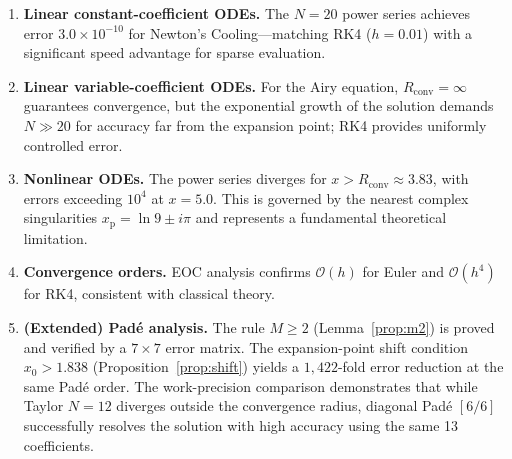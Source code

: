 \documentclass[12pt,a4paper]{article}
\theoremstyle{definition}
\theoremstyle{remark}
\newcommand{\Rconv}{R_{\mathrm{conv}}}
\newcommand{\xp}{x_{\mathrm{p}}}
\newcommand{\OO}{\mathcal{O}}
\begin{document}
\begin{enumerate}
  \item \textbf{Linear constant-coefficient ODEs.}
        The $N = 20$ power series achieves error $3.0 \times 10^{-10}$
        for Newton's Cooling---matching RK4 ($h = 0.01$) with a
        significant speed advantage for sparse evaluation.

  \item \textbf{Linear variable-coefficient ODEs.}
        For the Airy equation, $\Rconv = \infty$ guarantees
        convergence, but the exponential growth of the solution
        demands $N \gg 20$ for accuracy far from the expansion point;
        RK4 provides uniformly controlled error.

  \item \textbf{Nonlinear ODEs.}
        The power series diverges for $x > \Rconv \approx 3.83$,
        with errors exceeding $10^4$ at $x = 5.0$.  This is governed
        by the nearest complex singularities $\xp = \ln 9 \pm i\pi$
        and represents a fundamental theoretical limitation.

  \item \textbf{Convergence orders.}
        EOC analysis confirms $\OO(h)$ for Euler and $\OO(h^4)$ for
        RK4, consistent with classical theory.

  \item \textbf{(Extended) Padé analysis.}
        The rule $M \geq 2$ (Lemma~\ref{prop:m2}) is proved
        and verified by a $7 \times 7$ error matrix.  The
        expansion-point shift condition $x_0 > 1.838$
        (Proposition~\ref{prop:shift}) yields a $1{,}422$-fold error
        reduction at the same Padé order.  The work-precision comparison
        demonstrates that while Taylor $N = 12$ diverges outside the convergence radius,
        diagonal Padé $[6/6]$ successfully resolves the solution with high accuracy using the same 13 coefficients.
\end{enumerate}
\end{document}
